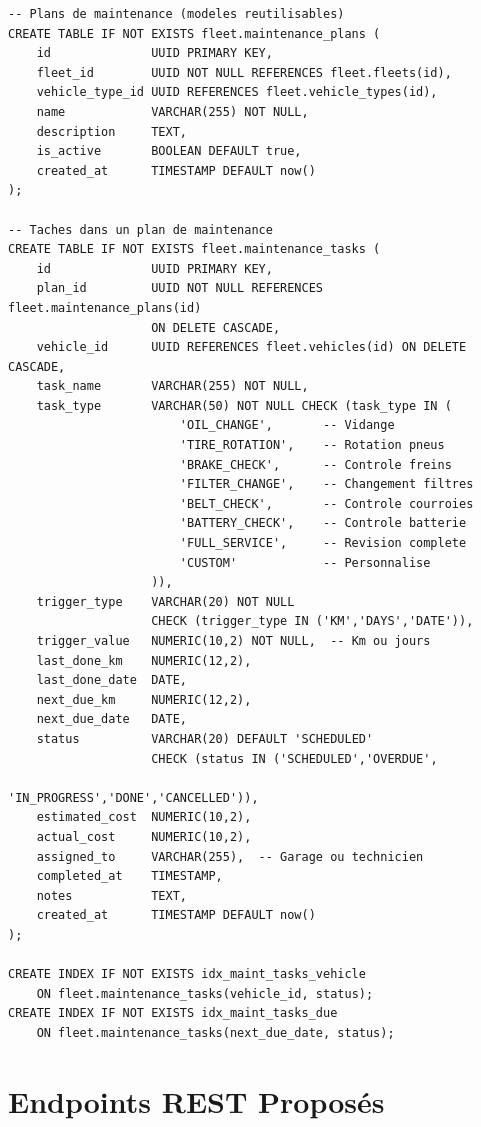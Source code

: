 \documentclass[12pt,a4paper]{report}
\begin{document}
\begin{lstlisting}[style=sqlStyle, caption={Tables du module Maintenance Préventive}]
-- Plans de maintenance (modeles reutilisables)
CREATE TABLE IF NOT EXISTS fleet.maintenance_plans (
    id              UUID PRIMARY KEY,
    fleet_id        UUID NOT NULL REFERENCES fleet.fleets(id),
    vehicle_type_id UUID REFERENCES fleet.vehicle_types(id),
    name            VARCHAR(255) NOT NULL,
    description     TEXT,
    is_active       BOOLEAN DEFAULT true,
    created_at      TIMESTAMP DEFAULT now()
);

-- Taches dans un plan de maintenance
CREATE TABLE IF NOT EXISTS fleet.maintenance_tasks (
    id              UUID PRIMARY KEY,
    plan_id         UUID NOT NULL REFERENCES fleet.maintenance_plans(id)
                    ON DELETE CASCADE,
    vehicle_id      UUID REFERENCES fleet.vehicles(id) ON DELETE CASCADE,
    task_name       VARCHAR(255) NOT NULL,
    task_type       VARCHAR(50) NOT NULL CHECK (task_type IN (
                        'OIL_CHANGE',       -- Vidange
                        'TIRE_ROTATION',    -- Rotation pneus
                        'BRAKE_CHECK',      -- Controle freins
                        'FILTER_CHANGE',    -- Changement filtres
                        'BELT_CHECK',       -- Controle courroies
                        'BATTERY_CHECK',    -- Controle batterie
                        'FULL_SERVICE',     -- Revision complete
                        'CUSTOM'            -- Personnalise
                    )),
    trigger_type    VARCHAR(20) NOT NULL
                    CHECK (trigger_type IN ('KM','DAYS','DATE')),
    trigger_value   NUMERIC(10,2) NOT NULL,  -- Km ou jours
    last_done_km    NUMERIC(12,2),
    last_done_date  DATE,
    next_due_km     NUMERIC(12,2),
    next_due_date   DATE,
    status          VARCHAR(20) DEFAULT 'SCHEDULED'
                    CHECK (status IN ('SCHEDULED','OVERDUE',
                                      'IN_PROGRESS','DONE','CANCELLED')),
    estimated_cost  NUMERIC(10,2),
    actual_cost     NUMERIC(10,2),
    assigned_to     VARCHAR(255),  -- Garage ou technicien
    completed_at    TIMESTAMP,
    notes           TEXT,
    created_at      TIMESTAMP DEFAULT now()
);

CREATE INDEX IF NOT EXISTS idx_maint_tasks_vehicle
    ON fleet.maintenance_tasks(vehicle_id, status);
CREATE INDEX IF NOT EXISTS idx_maint_tasks_due
    ON fleet.maintenance_tasks(next_due_date, status);
\end{lstlisting}

\section{Endpoints REST Proposés}
\end{document}
